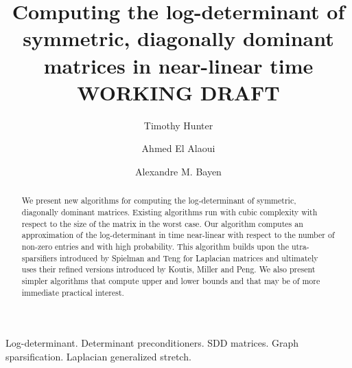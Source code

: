 \documentclass[11pt,onefignum,onetabnum]{siamltex}
\title{Computing the log-determinant of symmetric, diagonally dominant matrices
in near-linear time\\
WORKING DRAFT}
\author{Timothy Hunter \and Ahmed {El Alaoui} \and Alexandre M. Bayen}
\begin{document}
\maketitle

\begin{abstract}
We present new algorithms for computing the log-determinant of symmetric,
diagonally dominant matrices. Existing algorithms run with cubic complexity
with respect to the size of the matrix in the worst case. Our algorithm 
computes an approximation of the log-determinant in time near-linear with 
respect to the number of non-zero entries and with high probability. This 
algorithm builds upon the utra-sparsifiers introduced by Spielman and Teng for
Laplacian matrices and ultimately uses their refined versions introduced by Koutis, Miller and Peng. We also present simpler algorithms that compute upper and 
lower bounds and that may be of more immediate practical interest.
\end{abstract}

\begin{keywords}
Log-determinant.
Determinant preconditioners.
SDD matrices.
Graph sparsification.
Laplacian generalized stretch.
\end{keywords}

\begin{AMS}\end{AMS}


\pagestyle{myheadings}

\thispagestyle{plain}














% 

% 
\end{document}
